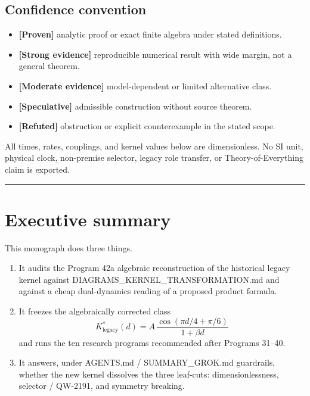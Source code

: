 \documentclass[11pt,a4paper,openany]{report}
\newcommand{\statusProven}{\textcolor{fingreen}{[Proven]}}
\newcommand{\statusStrong}{\textcolor{finblue}{[Strong evidence]}}
\newcommand{\statusModerate}{\textcolor{finviolet}{[Moderate evidence]}}
\newcommand{\statusSpeculative}{\textcolor{finorange}{[Speculative]}}
\newcommand{\statusRefuted}{\textcolor{finred}{[Refuted]}}
\begin{document}
\tableofcontents
\clearpage
{}

\section{Confidence convention}

\begin{itemize}
\item 
\textbf{\statusProven{}} analytic proof or exact finite algebra under stated definitions.

\item 
\textbf{\statusStrong{}} reproducible numerical result with wide margin, not a general theorem.

\item 
\textbf{\statusModerate{}} model-dependent or limited alternative class.

\item 
\textbf{\statusSpeculative{}} admissible construction without source theorem.

\item 
\textbf{\statusRefuted{}} obstruction or explicit counterexample in the stated scope.

\end{itemize}

All times, rates, couplings, and kernel values below are dimensionless. No SI unit, physical clock, non-premise selector, legacy role transfer, or Theory-of-Everything claim is exported.

\par\medskip\hrule\medskip

\chapter{Executive summary}

This monograph does three things.

\begin{enumerate}
\item 
It audits the Program 42a algebraic reconstruction of the historical legacy kernel against DIAGRAMS\_KERNEL\_TRANSFORMATION.md and against a cheap dual-dynamics reading of a proposed product formula.

\item 
It freezes the algebraically corrected class \[
   K^*_{\mathrm{legacy}}(d)
   =
   A\,\frac{\cos(\pi d/4+\pi/6)}{1+\beta d}
   \] and runs the ten research programs recommended after Programs 31–40.

\item 
It answers, under AGENTS.md /\allowbreak{} SUMMARY\_GROK.md guardrails, whether the new kernel dissolves the three leaf-cuts: dimensionlessness, selector /\allowbreak{} QW-2191, and symmetry breaking.

\end{enumerate}
\end{document}
